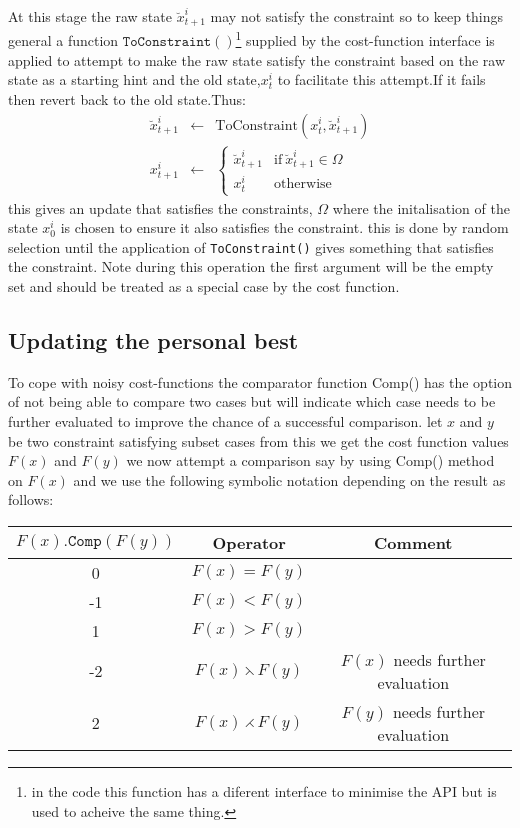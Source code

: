 \documentclass[a4paper,oneside,english]{article}
\numberwithin{equation}{section}
\numberwithin{figure}{section}
\begin{document}
At this stage the raw state $\breve{x}_{t+1}^i$ may not satisfy the constraint so to keep things general a function $\mathtt{ToConstraint()}$\footnote{in the code this function has a diferent interface to minimise the API but is used to acheive the same thing.} supplied by the cost-function interface is applied  to attempt to make the raw state  satisfy the constraint based on the raw state as a starting hint and the old state,$x_t^i$ to facilitate this attempt.If it fails then revert back to the old state.Thus: 
\begin{align}
\breve{x}_{t+1}^i&\leftarrow&\mathrm{ToConstraint}(x_t^i,\breve{x}_{t+1}^i)\\
x_{t+1}^i &\leftarrow& \left\lbrace
\begin{array}{cc}
\breve{x}_{t+1}^i& \mathrm{if}\: \breve{x}_{t+1}^i \in \Omega\\
x_t^i&\mathrm{otherwise}
\end{array}\right.
\end{align} 
this gives an update that satisfies the constraints, $\Omega$ where  the initalisation of the state $x_0^i$ is chosen to ensure it also satisfies the constraint. this is done by random selection until the application of  \texttt{ToConstraint()} gives something that satisfies the constraint. Note during this operation the first argument will be the empty set and should be treated as a special case by the cost function.

\subsection{Updating the personal best}
To cope with noisy cost-functions the comparator function Comp() has the option of not being able to compare two  cases but will indicate which case needs to be further evaluated to improve the chance of a successful  comparison. let $x$  and $y$ be two constraint satisfying subset cases from this we get the cost function values $F(x)$ and $F(y)$ we now attempt a comparison say by using Comp() method on $F(x)$ and we use the  following symbolic notation depending on the result as follows:

\begin{tabular}{|c|c|c|}\hline
$F(x).\mathtt{Comp}(F(y))$ & Operator& Comment\\
\hline \hline 
0& $F(x)=F(y)$& \\
-1& $F(x)<F(y)$ &\\
1&$F(x)>F(y)$ &\\
-2&$F(x)\leftthreetimes F(y)$& $F(x)$ needs further evaluation\\
2&$F(x)\rightthreetimes F(y)$& $F(y)$ needs further evaluation\\
\hline	
	
\end{tabular}
\end{document}
